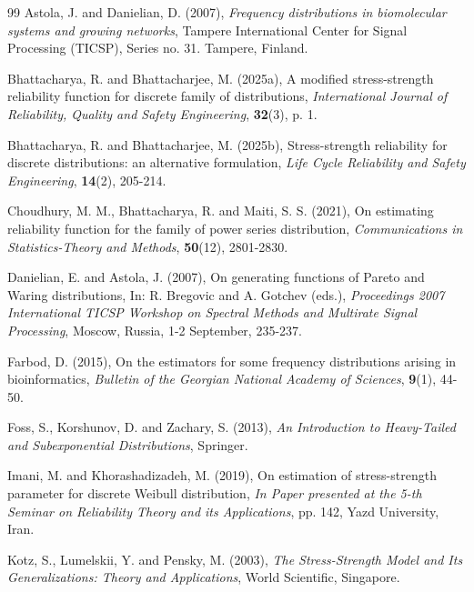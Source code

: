\documentclass[twoside]{article}
\begin{document}
\begin{thebibliography}{99}
Astola, J.  and  Danielian, D.  (2007),  {\it Frequency distributions in biomolecular systems and growing networks}, Tampere International Center for Signal Processing (TICSP),  Series no. 31.  Tampere, Finland. 

Bhattacharya, R. and Bhattacharjee, M. (2025a),  A  modified  stress-strength  reliability  function  for discrete  family of  distributions,
 \textit{International Journal of Reliability, Quality and  Safety Engineering},  \textbf{32}(3), p. 1. 

Bhattacharya, R. and  Bhattacharjee, M. (2025b),  Stress-strength reliability for discrete distributions: an alternative formulation, \textit{Life Cycle Reliability and Safety Engineering}, \textbf{14}(2), 205-214.

Choudhury, M. M., Bhattacharya, R. and  Maiti, S. S.  (2021), On estimating reliability function for the family of power series distribution, \textit{Communications in Statistics-Theory and Methods}, \textbf{50}(12), 2801-2830.
  
Danielian, E. and Astola, J. (2007), On generating functions of Pareto and Waring distributions, In: R. Bregovic and A. Gotchev (eds.),  \textit{Proceedings 2007  International TICSP Workshop on Spectral Methods and Multirate Signal Processing}, Moscow, Russia, 1-2 September,  235-237.
 
Farbod, D. (2015), On the estimators for some frequency distributions arising in bioinformatics, \textit{Bulletin of the Georgian National Academy of Sciences}, \textbf{9}(1), 44-50.

Foss, S., Korshunov, D.  and  Zachary, S. (2013),  \textit{An Introduction to Heavy-Tailed and Subexponential Distributions}, Springer.

Imani, M. and  Khorashadizadeh, M.  (2019),  On estimation of stress-strength parameter for discrete Weibull distribution, \textit{In Paper presented at  the   5-th Seminar on Reliability Theory and its Applications}, pp. 142, Yazd University, Iran.


Kotz, S., Lumelskii, Y. and Pensky, M. (2003), \textit{The Stress-Strength Model and Its Generalizations: Theory and Applications}, World Scientific, Singapore.


\end{thebibliography}
\end{document}
